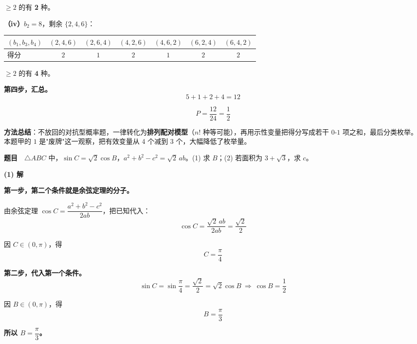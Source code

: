 $\ge2$ 的有 \textbf{2} 种。

\textbf{（iv）$b_2=8$}，剩余 $\{2,4,6\}$：

\begin{center}
\begin{tabular}{lcccccc}
\toprule
$\left(b_1,b_3,b_4\right)$ & $(2,4,6)$ & $(2,6,4)$ & $(4,2,6)$ & $(4,6,2)$ & $(6,2,4)$ & $(6,4,2)$ \\
\midrule
得分 & $2$ & $1$ & $2$ & $1$ & $2$ & $2$ \\
\bottomrule
\end{tabular}
\end{center}

$\ge2$ 的有 \textbf{4} 种。

\textbf{第四步，汇总。}
\[5+1+2+4=12\]

\[P=\frac{12}{24}=\frac12\]


\begin{gktip}
\textbf{方法总结}：不放回的对抗型概率题，一律转化为\textbf{排列配对模型}（$n!$ 种等可能），再用示性变量把得分写成若干 $0$-$1$ 项之和，最后分类枚举。本题甲的 $1$ 是"废牌"这一观察，把有效变量从 4 个减到 3 个，大幅降低了枚举量。
\end{gktip}

\par\medskip



\textbf{题目}　$\triangle ABC$ 中，$\sin C=\sqrt2\cos B$，$a^{2}+b^{2}-c^{2}=\sqrt2\,ab$。(1) 求 $B$；(2) 若面积为 $3+\sqrt3$，求 $c$。

\par\medskip

\textbf{(1) 解}

\textbf{第一步，第二个条件就是余弦定理的分子。}

由余弦定理 $\cos C=\dfrac{a^{2}+b^{2}-c^{2}}{2ab}$，把已知代入：
\[\cos C=\frac{\sqrt2\,ab}{2ab}=\frac{\sqrt2}2\]

因 $C\in(0,\pi)$，得
\[C=\frac\pi4\]

\textbf{第二步，代入第一个条件。}
\[\sin C=\sin\frac\pi4=\frac{\sqrt2}2=\sqrt2\cos B\ \Longrightarrow\ \cos B=\frac12\]

因 $B\in(0,\pi)$，得
\[B=\frac\pi3\]

\textbf{所以 $B=\dfrac\pi3$。}

\par\medskip


